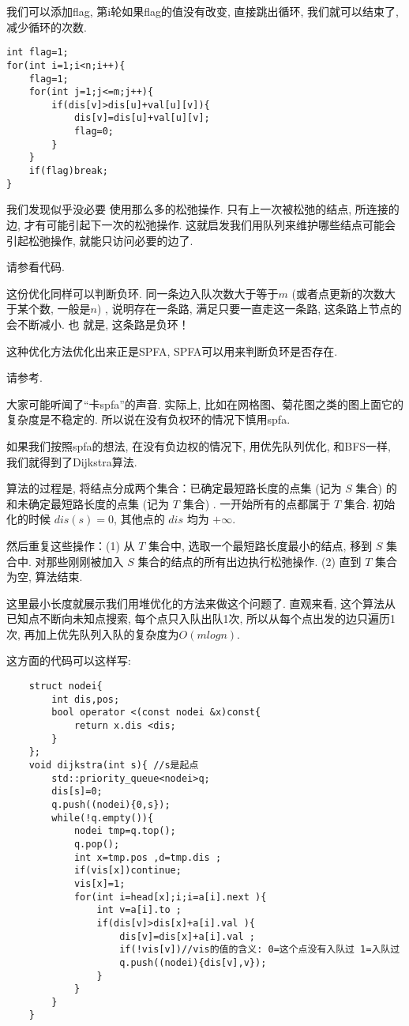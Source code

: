  我们可以添加flag, 第i轮如果flag的值没有改变, 直接跳出循环, 
我们就可以结束了, 减少循环的次数. 
\begin{lstlisting}
int flag=1;
for(int i=1;i<n;i++){
    flag=1;
    for(int j=1;j<=m;j++){
        if(dis[v]>dis[u]+val[u][v]){
            dis[v]=dis[u]+val[u][v];
            flag=0;
        }
    }
    if(flag)break;
}    
\end{lstlisting}

 我们发现似乎没必要
使用那么多的松弛操作. 只有上一次被松弛的结点, 所连接的边, 才有可能引起下一次的松弛操作. 
这就启发我们用队列来维护哪些结点可能会引起松弛操作, 就能只访问必要的边了. 

 请参看代码. 

这份优化同样可以判断负环. 同一条边入队次数大于等于$m$ (或者点更新的次数大于某个数, 一般是$n$) , 
说明存在一条路, 满足只要一直走这一条路, 这条路上节点的会不断减小. 也
就是, 这条路是负环！

这种优化方法优化出来正是SPFA, SPFA可以用来判断负环是否存在. 

 请参考.

大家可能听闻了``卡spfa''的声音. 实际上, 比如在网格图、菊花图之类的图上面它的复杂度是不稳定的. 
所以说在没有负权环的情况下慎用spfa. 

 如果我们按照spfa的想法, 在没有负边权的情况下, 用优先队列优化, 
和BFS一样, 我们就得到了Dijkstra算法. 

算法的过程是, 将结点分成两个集合：已确定最短路长度的点集 (记为 $S$ 集合) 
的和未确定最短路长度的点集 (记为 $T$ 集合) . 一开始所有的点都属于 $T$ 集合. 
初始化的时候 $dis(s)=0$, 其他点的 $dis$ 均为 $+\infty$. 

然后重复这些操作：(1) 从 $T$ 集合中, 选取一个最短路长度最小的结点, 移到 $S$ 集合中. 
对那些刚刚被加入 $S$ 集合的结点的所有出边执行松弛操作. 
(2) 直到 $T$ 集合为空, 算法结束. 

这里最小长度就展示我们用堆优化的方法来做这个问题了. 直观来看, 这个算法从已知点不断向未知点搜索, 
每个点只入队出队1次, 所以从每个点出发的边只遍历1次, 再加上优先队列入队的复杂度为$O(mlogn)$. 

这方面的代码可以这样写: 

\begin{lstlisting}
    struct nodei{
        int dis,pos;
        bool operator <(const nodei &x)const{
            return x.dis <dis;
        }
    };
    void dijkstra(int s){ //s是起点
        std::priority_queue<nodei>q;
        dis[s]=0;
        q.push((nodei){0,s});
        while(!q.empty()){
            nodei tmp=q.top();
            q.pop();
            int x=tmp.pos ,d=tmp.dis ;
            if(vis[x])continue;
            vis[x]=1;
            for(int i=head[x];i;i=a[i].next ){
                int v=a[i].to ;
                if(dis[v]>dis[x]+a[i].val ){
                    dis[v]=dis[x]+a[i].val ;
                    if(!vis[v])//vis的值的含义: 0=这个点没有入队过 1=入队过
                    q.push((nodei){dis[v],v});
                }
            }
        }
    }    
\end{lstlisting}


